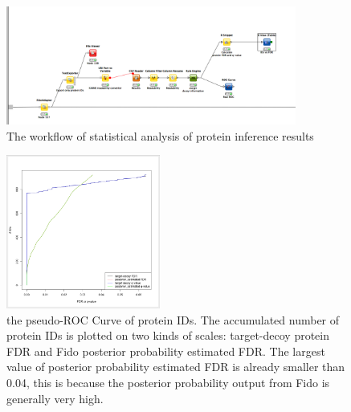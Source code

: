 \begin{figure}[htbp]
  \centering
  \includegraphics[width=0.85\textwidth]{graphics/protein_inference/ProteinInferenceKNIME_workflow.pdf}
  \caption{The workflow of statistical analysis of protein inference results}
  \label{fig:proteininference}
\end{figure}

\begin{figure}[htbp]
  \centering
  \includegraphics[width=0.45\textwidth]{graphics/protein_inference/proteinFDR.png}
  \caption{the pseudo-ROC Curve of protein IDs. The accumulated number of protein IDs is plotted on two kinds of scales: target-decoy protein FDR and Fido posterior probability estimated FDR. The largest value of posterior probability estimated FDR is already smaller than 0.04, this is because the posterior probability output from Fido is generally very high.}
  \label{fig:proteinfdr}
\end{figure}

                                                                                                                      
